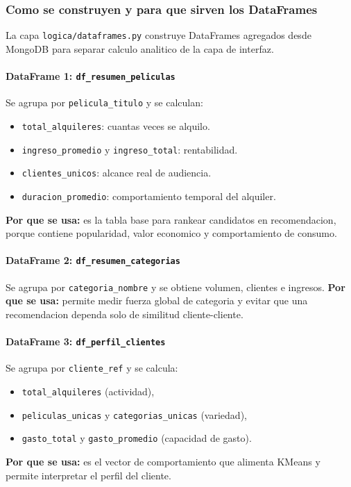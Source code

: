 ﻿\documentclass{article}
\begin{document}
\subsubsection{Como se construyen y para que sirven los DataFrames}
La capa \texttt{logica/dataframes.py} construye DataFrames agregados desde MongoDB para separar calculo analitico de la capa de interfaz.

\paragraph{DataFrame 1: \texttt{df\_resumen\_peliculas}}
Se agrupa por \texttt{pelicula\_titulo} y se calculan:
\begin{itemize}
    \item \texttt{total\_alquileres}: cuantas veces se alquilo.
    \item \texttt{ingreso\_promedio} y \texttt{ingreso\_total}: rentabilidad.
    \item \texttt{clientes\_unicos}: alcance real de audiencia.
    \item \texttt{duracion\_promedio}: comportamiento temporal del alquiler.
\end{itemize}
\textbf{Por que se usa:} es la tabla base para rankear candidatos en recomendacion, porque contiene popularidad, valor economico y comportamiento de consumo.

\paragraph{DataFrame 2: \texttt{df\_resumen\_categorias}}
Se agrupa por \texttt{categoria\_nombre} y se obtiene volumen, clientes e ingresos.
\textbf{Por que se usa:} permite medir fuerza global de categoria y evitar que una recomendacion dependa solo de similitud cliente-cliente.

\paragraph{DataFrame 3: \texttt{df\_perfil\_clientes}}
Se agrupa por \texttt{cliente\_ref} y se calcula:
\begin{itemize}
    \item \texttt{total\_alquileres} (actividad),
    \item \texttt{peliculas\_unicas} y \texttt{categorias\_unicas} (variedad),
    \item \texttt{gasto\_total} y \texttt{gasto\_promedio} (capacidad de gasto).
\end{itemize}
\textbf{Por que se usa:} es el vector de comportamiento que alimenta KMeans y permite interpretar el perfil del cliente.
\end{document}
